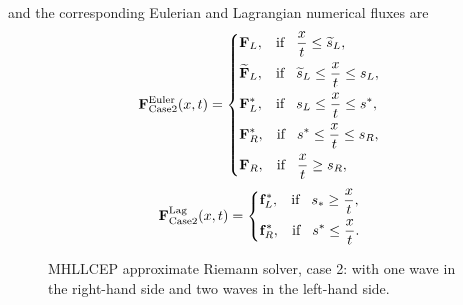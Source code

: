 \documentclass[review]{elsarticle}
\begin{document}
  and the corresponding Eulerian and Lagrangian numerical fluxes are
 \begin{equation}\label{eq:HLLCEP}
   \mathbf{F}^{\text{Euler}}_{\text{Case2}}(x,t) = \left\{ \begin{aligned}
       & \mathbf{F}_L, \hspace{0.3cm} \text{if} \hspace{0.3cm} \frac{x}{t}\le \widetilde{s}_L, \\
        &  \widetilde{\mathbf{F}}_L, \hspace{0.3cm} \text{if} \hspace{0.3cm} \widetilde{s}_L\le \frac{x}{t} \le   s_L , \\
        &\mathbf{F}_L^*, \hspace{0.3cm} \text{if} \hspace{0.3cm} s_L\le \frac{x}{t} \le s^*, \\
        & \mathbf{F}_R^*, \hspace{0.3cm} \text{if} \hspace{0.3cm} s^*\le \frac{x}{t} \le s_R,\\
        & \mathbf{F}_R, \hspace{0.3cm} \text{if} \hspace{0.3cm} \frac{x}{t}\ge s_R, \\
      \end{aligned}
    \right.
  \end{equation}
\begin{equation}
    \mathbf{F}^{\text{Lag}}_{\text{Case2}}(x,t) = \left\{ \begin{aligned}
        & \mathbf{f}_L^*, \hspace{0.3cm} \text{if} \hspace{0.3cm} s_*\ge \frac{x}{t},\\
        & \mathbf{f}_R^*, \hspace{0.3cm} \text{if} \hspace{0.3cm} s^*\le \frac{x}{t}.\\
      \end{aligned}
    \right.
  \end{equation}
%
\begin{figure}[ht]
   \centering
{}
\caption{MHLLCEP approximate Riemann solver, case 2: with  one wave in the right-hand side and  two waves in the left-hand side.}
\label{fig:case2}
\end{figure}
\end{document}
